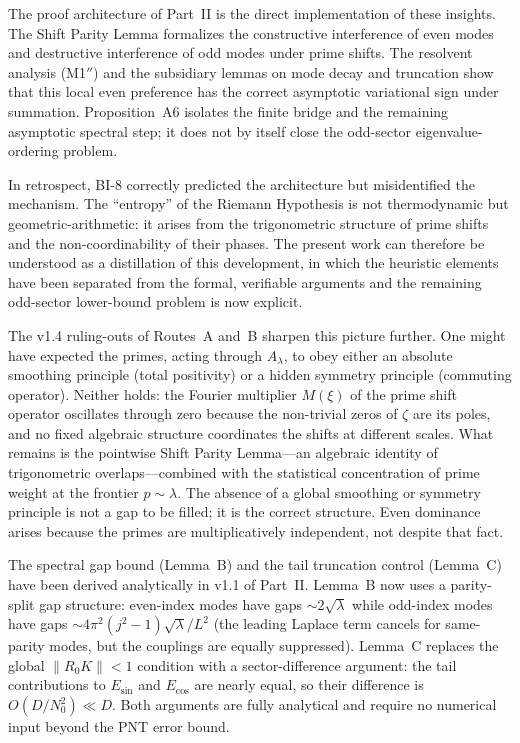 \documentclass[12pt,a4paper]{article}
\theoremstyle{definition}
\theoremstyle{remark}
\begin{document}
The proof architecture of Part~II is the direct implementation of these
insights. The Shift Parity Lemma formalizes the constructive interference of
even modes and destructive interference of odd modes under prime shifts. The
resolvent analysis (M1$''$) and the subsidiary lemmas on mode decay and
truncation show that this local even preference has the correct asymptotic
variational sign under summation. Proposition~A6 isolates the finite bridge
and the remaining asymptotic spectral step; it does not by itself close the
odd-sector eigenvalue-ordering problem.

In retrospect, BI-8 correctly predicted the architecture but misidentified the mechanism. The ``entropy'' of the Riemann Hypothesis is not thermodynamic but geometric-arithmetic: it arises from the trigonometric structure of prime shifts and the non-coordinability of their phases. The present work can therefore be understood as a distillation of this development, in which the heuristic elements have been separated from the formal, verifiable arguments and the remaining odd-sector lower-bound problem is now explicit.

The v1.4 ruling-outs of Routes~A and~B sharpen this picture further. One might have expected the primes, acting through $A_\lambda$, to obey either an absolute smoothing principle (total positivity) or a hidden symmetry principle (commuting operator). Neither holds: the Fourier multiplier $M(\xi)$ of the prime shift operator oscillates through zero because the non-trivial zeros of $\zeta$ are its poles, and no fixed algebraic structure coordinates the shifts at different scales. What remains is the pointwise Shift Parity Lemma---an algebraic identity of trigonometric overlaps---combined with the statistical concentration of prime weight at the frontier $p \sim \lambda$. The absence of a global smoothing or symmetry principle is not a gap to be filled; it is the correct structure. Even dominance arises because the primes are multiplicatively independent, not despite that fact.

The spectral gap bound (Lemma~B) and the tail truncation control (Lemma~C) have been derived analytically in v1.1 of Part~II. Lemma~B now uses a parity-split gap structure: even-index modes have gaps $\sim 2\sqrt{\lambda}$ while odd-index modes have gaps $\sim 4\pi^2(j^2-1)\sqrt{\lambda}/L^2$ (the leading Laplace term cancels for same-parity modes, but the couplings are equally suppressed). Lemma~C replaces the global $\|R_0 K\| < 1$ condition with a sector-difference argument: the tail contributions to $E_{\sin}$ and $E_{\cos}$ are nearly equal, so their difference is $O(D/N_0^2) \ll D$. Both arguments are fully analytical and require no numerical input beyond the PNT error bound.
\end{document}
